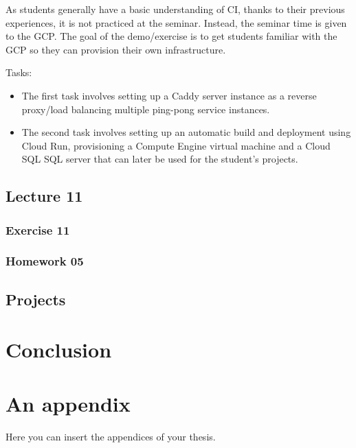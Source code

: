 \documentclass[
  digital,
  color,
  oneside,
  nosansbold,
  nocolorbold,
  lof,
  lot,
]{fithesis4}
\begin{document}
As students generally have a basic understanding of CI, thanks to their previous experiences, it is not practiced at the seminar. Instead, the seminar time is given to the GCP. The goal of the demo/exercise is to get students familiar with the GCP so they can provision their own infrastructure.

Tasks:
\begin{itemize}
    \item The first task involves setting up a Caddy server instance as a reverse proxy/load balancing multiple ping-pong service instances.
    \item The second task involves setting up an automatic build and deployment using Cloud Run, provisioning a Compute Engine virtual machine and a Cloud SQL SQL server that can later be used for the student's projects.
\end{itemize}
    
\section{Lecture 11}

\subsection{Exercise 11}

\subsection{Homework 05}

\section{Projects}

\chapter{Conclusion}

\makeatletter\thesis@blocks@clear\makeatother
{}
{}
\printindex

\printbibliography[heading=bibintoc]

\appendix
\chapter{An appendix}

Here you can insert the appendices of your thesis.
\end{document}
